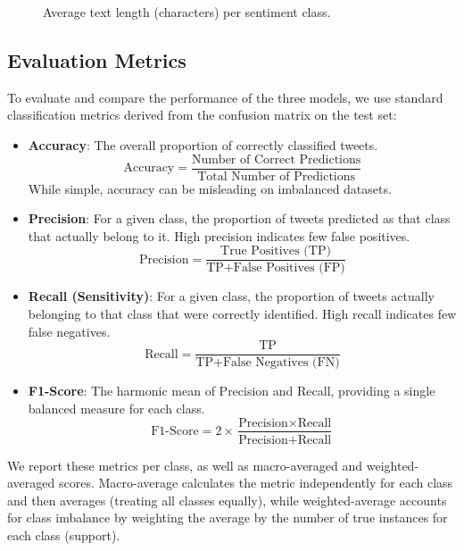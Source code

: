 \documentclass[10pt,twocolumn]{article}
\begin{document}
\begin{figure}[H]
    \centering
    \caption{Average text length (characters) per sentiment class.}
    \label{fig:avg_length}
\end{figure}

\subsection{Evaluation Metrics}
\label{subsec:exp_metrics}

To evaluate and compare the performance of the three models, we use standard classification metrics derived from the confusion matrix on the test set:
\begin{itemize}[itemsep=0pt, topsep=3pt]
    \item \textbf{Accuracy}: The overall proportion of correctly classified tweets.
    $$ \text{Accuracy} = \frac{\text{Number of Correct Predictions}}{\text{Total Number of Predictions}} $$
    While simple, accuracy can be misleading on imbalanced datasets.
    \item \textbf{Precision}: For a given class, the proportion of tweets predicted as that class that actually belong to it. High precision indicates few false positives.
    $$ \text{Precision} = \frac{\text{True Positives (TP)}}{\text{TP} + \text{False Positives (FP)}} $$
    \item \textbf{Recall (Sensitivity)}: For a given class, the proportion of tweets actually belonging to that class that were correctly identified. High recall indicates few false negatives.
    $$ \text{Recall} = \frac{\text{TP}}{\text{TP} + \text{False Negatives (FN)}} $$
    \item \textbf{F1-Score}: The harmonic mean of Precision and Recall, providing a single balanced measure for each class.
    $$ \text{F1-Score} = 2 \times \frac{\text{Precision} \times \text{Recall}}{\text{Precision} + \text{Recall}} $$
\end{itemize}
We report these metrics per class, as well as macro-averaged and weighted-averaged scores. Macro-average calculates the metric independently for each class and then averages (treating all classes equally), while weighted-average accounts for class imbalance by weighting the average by the number of true instances for each class (support).
\end{document}
